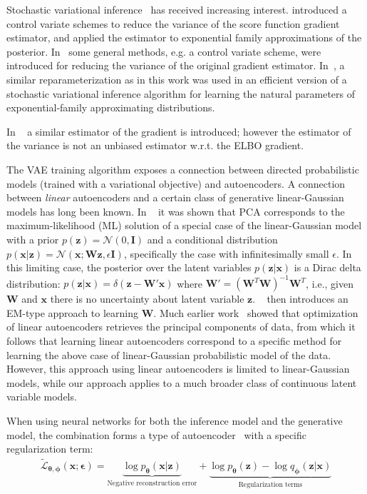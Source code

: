 \documentclass[MAL,biber]{nowfnt} %
\newcommand{\bb}[1]{\mathbf{#1}}
\newcommand{\bx}{\bb{x}}
\newcommand{\bz}{\bb{z}}
\newcommand{\bT}{\boldsymbol{\theta}}
\newcommand{\bphi}{\boldsymbol{\phi}}
\newcommand{\beps}{\boldsymbol{\epsilon}}
\newcommand{\bW}{\bb{W}}
\newcommand{\bI}{\bb{I}}
\newcommand{\pT}{p_{\bT}}
\newcommand{\qP}{q_{\bphi}}
\newcommand{\TELBO}{\tilde{\mathcal{L}}_{\bT,\bphi}}
\begin{document}
Stochastic variational inference~\cite{hoffman2013stochastic} has received increasing interest. \cite{blei2012variational} introduced a control variate schemes to reduce the variance of the score function gradient estimator, and applied the estimator to exponential family approximations of the posterior. In~\citep{ranganath2013black} some general methods, e.g. a control variate scheme, were introduced for reducing the variance of the original gradient estimator. In~\citep{salimans2013fixedform}, a similar reparameterization as in this work was used in an efficient version of a stochastic variational inference algorithm for learning the natural parameters of exponential-family approximating distributions.

In ~\cite{graves2011practical} a similar estimator of the gradient is introduced; however the estimator of the variance is not an unbiased estimator w.r.t. the ELBO gradient.

The VAE training algorithm exposes a connection between directed probabilistic models (trained with a variational objective) and autoencoders. A connection between \emph{linear} autoencoders and a certain class of generative linear-Gaussian models has long been known. In ~\citep{roweis1998algorithms} it was shown that PCA corresponds to the maximum-likelihood (ML) solution of a special case of the linear-Gaussian model with a prior $p(\bz) = \mathcal{N}(0,\bI)$ and a conditional distribution $p(\bx|\bz) = \mathcal{N}(\bx; \bW \bz, \epsilon \bI)$, specifically the case with infinitesimally small $\epsilon$.
In this limiting case, the posterior over the latent variables $p(\bz|\bx)$ is a Dirac delta distribution: $p(\bz|\bx) = \delta(\bz-\bW'\bx)$ where $\bW' = (\bW^T \bW)^{-1} \bW^T$, i.e., given $\bW$ and $\bx$ there is no uncertainty about latent variable $\bz$. ~\cite{roweis1998algorithms} then introduces an EM-type approach to learning $\bW$.
Much earlier work~\citep{bourlard1988auto} showed that optimization of linear autoencoders retrieves the principal components of data, from which it follows that learning linear autoencoders correspond to a specific method for learning the above case of linear-Gaussian probabilistic model of the data. However, this approach using linear autoencoders is limited to linear-Gaussian models, while our approach applies to a much broader class of continuous latent variable models.

When using neural networks for both the inference model and the generative model, the combination forms a type of autoencoder~\citep{goodfellow2016deeplearning} with a specific regularization term:
\begin{align}
\TELBO(\bx;\beps) =  \underbrace{ \log \pT(\bx|\bz) }_{\text{Negative reconstruction error}}
+ \underbrace{ \log \pT(\bz) - \log \qP(\bz|\bx) }_{\text{Regularization terms}}
\end{align}
\end{document}
